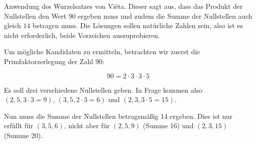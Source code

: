 \item Anwendung des Wurzelsatzes von Vi\"{e}ta. Dieser sagt aus, dass das Produkt der Nullstellen den Wert $90$ ergeben muss und zudem die Summe der Nullstellen auch gleich $14$ betragen muss. Die Lösungen sollen natürliche Zahlen sein, also ist es nicht erforderlich, beide Vorzeichen auszuprobieren.

Um mögliche Kandidaten zu ermitteln, betrachten wir zuerst die Primfaktorzerlegung der Zahl $90$:

$$90 = 2 \cdot 3 \cdot 3 \cdot 5$$

Es soll drei verschiedene Nullstellen geben. In Frage kommen also $(2,5,3\cdot 3 = 9)$, $(3, 5, 2\cdot 3 = 6)$ und $(2,3,3\cdot 5 = 15)$.

Nun muss die Summe der Nullstellen betragsmäßig 14 ergeben. Dies ist nur erfüllt für $(3,5,6)$, nicht aber für $(2,5,9)$ (Summe 16) und $(2,3,15)$ (Summe 20).

